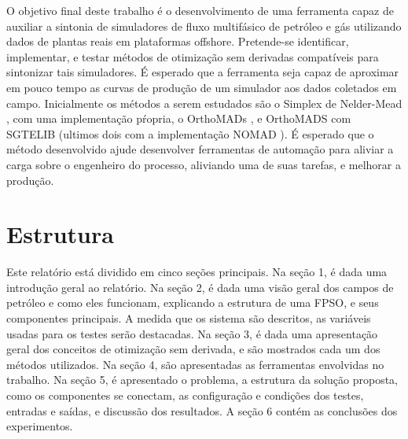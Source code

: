 O objetivo final deste trabalho é o desenvolvimento de uma ferramenta capaz de auxiliar a sintonia de simuladores de fluxo multifásico de petróleo e gás utilizando dados de plantas reais em plataformas offshore. 
%
Pretende-se identificar, implementar, e testar métodos de otimização sem derivadas compatíveis para sintonizar tais simuladores.
%
É esperado que a ferramenta seja capaz de aproximar em pouco tempo as curvas de produção de um simulador aos dados coletados em campo.
%
Inicialmente os métodos a serem estudados são o Simplex de Nelder-Mead \cite{Singer:2009}, com uma implementação pŕopria, o OrthoMADs \cite{DBLP:journals/siamjo/AbramsonADD09}, e OrthoMADS com SGTELIB (ultimos dois com a implementação NOMAD \cite{Nomad}).
%
É esperado que o método desenvolvido ajude desenvolver ferramentas de automação para aliviar a carga sobre o engenheiro do processo, aliviando uma de suas tarefas, e melhorar a produção.
%

%
\section{Estrutura}

Este relatório está dividido em cinco seções principais.
%
Na seção 1, é dada uma introdução geral ao relatório.
%
Na seção 2, é dada uma visão geral dos campos de petróleo e como eles funcionam, explicando a estrutura de uma FPSO, e seus componentes principais. 
%
A medida que os sistema são descritos, as variáveis usadas para os testes serão destacadas.
%
Na seção 3, é dada uma apresentação geral dos conceitos de otimização sem derivada, e são mostrados cada um dos métodos utilizados.
%
Na seção 4, são apresentadas as ferramentas envolvidas no trabalho.
%
Na seção 5, é apresentado o problema, a estrutura da solução proposta, como os componentes se conectam, as configuração e condições dos testes, entradas e saídas, e discussão dos resultados.
%
A seção 6 contém as conclusões dos experimentos.

 

